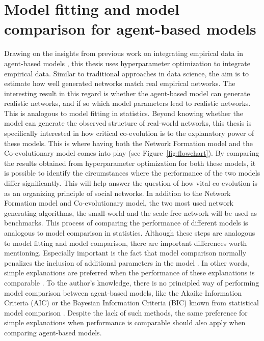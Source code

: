 \documentclass[11pt]{article}
\begin{document}
\section{Model fitting and model comparison for agent-based models}
\noindent Drawing on the insights from previous work on integrating empirical data in agent-based models \cite{kerr2021covasim, krivorotko2022agent}, this thesis uses hyperparameter optimization to integrate empirical data. Similar to traditional approaches in data science, the aim is to estimate how well generated networks match real empirical networks. The interesting result in this regard is whether the agent-based model can generate realistic networks, and if so which model parameters lead to realistic networks. This is analogous to model fitting in statistics. Beyond knowing whether the model can generate the observed structure of real-world networks, this thesis is specifically interested in how critical co-evolution is to the explanatory power of these models. This is where having both the Network Formation model and the Co-evolutionary model comes into play (see Figure~\ref{fig:flowchart}). By comparing the results obtained from hyperparameter optimization for both these models, it is possible to identify the circumstances where the performance of the two models differ significantly. This will help answer the question of how vital co-evolution is as an organizing principle of social networks. In addition to the Network Formation model and Co-evolutionary model, the two most used network generating algorithms, the small-world \cite{watts_collective_1998} and the scale-free network \cite{barabasi_scale-free_2003} will be used as benchmarks. This process of comparing the performance of different models is analogous to model comparison in statistics. 
Although these steps are analogous to model fitting and model comparison, there are important differences worth mentioning. Especially important is the fact that model comparison normally penalizes the inclusion of additional parameters in the model \cite{vrieze_model_2012}. In other words, simple explanations are preferred when the performance of these explanations is comparable \cite{ emiliano2014information, vrieze_model_2012}. To the author's knowledge, there is no principled way of performing model comparison between agent-based models, like the Akaike Information Criteria (AIC) or the Bayesian Information Criteria (BIC) known from statistical model comparison \cite{vrieze_model_2012}. Despite the lack of such methods, the same preference for simple explanations when performance is comparable should also apply when comparing agent-based models.
\end{document}

